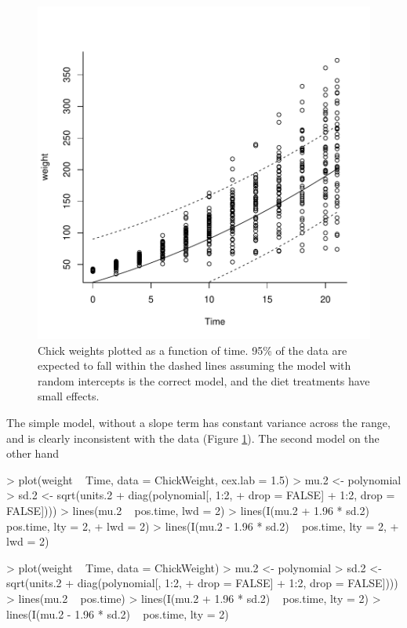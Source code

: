 \documentclass{article}
\begin{document}
\begin{figure}[!h]
\begin{center}
\includegraphics{Lecture4-034}
\end{center}
\caption{Chick weights plotted as a function of time. 95\% of the data are expected to fall within the dashed lines assuming the model with random intercepts is the correct model, and the diet treatments have small effects.}
\label{VCVpred.1-fig}
\end{figure}

The simple model, without a slope term has constant variance across the range, and is clearly inconsistent with the data (Figure \ref{VCVpred.1-fig}). The second model on the other hand

\iftalk
\begin{Schunk}
\begin{Sinput}
> plot(weight ~ Time, data = ChickWeight, cex.lab = 1.5)
> mu.2 <- polynomial %
> sd.2 <- sqrt(units.2 + diag(polynomial[, 1:2, 
+     drop = FALSE] %
+     1:2, drop = FALSE])))
> lines(mu.2 ~ pos.time, lwd = 2)
> lines(I(mu.2 + 1.96 * sd.2) ~ pos.time, lty = 2, 
+     lwd = 2)
> lines(I(mu.2 - 1.96 * sd.2) ~ pos.time, lty = 2, 
+     lwd = 2)
\end{Sinput}
\end{Schunk}
\else
\begin{Schunk}
\begin{Sinput}
> plot(weight ~ Time, data = ChickWeight)
> mu.2 <- polynomial %
> sd.2 <- sqrt(units.2 + diag(polynomial[, 1:2, 
+     drop = FALSE] %
+     1:2, drop = FALSE])))
> lines(mu.2 ~ pos.time)
> lines(I(mu.2 + 1.96 * sd.2) ~ pos.time, lty = 2)
> lines(I(mu.2 - 1.96 * sd.2) ~ pos.time, lty = 2)
\end{Sinput}
\end{Schunk}
\fi
\end{document}
